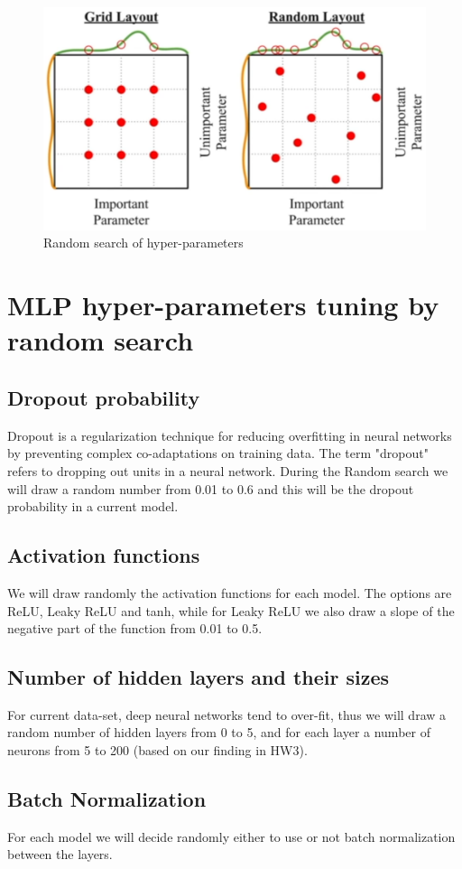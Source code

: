 \documentclass[12pt]{article}
\begin{document}
\begin{figure}[h]
\centering
\includegraphics[width=.6\linewidth]{pics/random_search}
\caption{Random search of hyper-parameters}
\end{figure}

\section{MLP hyper-parameters tuning by random search}
\subsection{Dropout probability}
Dropout is a regularization technique for reducing overfitting in neural networks by preventing complex co-adaptations on training data. The term "dropout" refers to dropping out units in a neural network. During the Random search we will draw a random number from 0.01 to 0.6 and this will be the dropout probability in a current model. 
\subsection{Activation functions}
We will draw randomly the activation functions for each model. The options are ReLU, Leaky ReLU and tanh, while for Leaky ReLU we also draw a slope of the negative part of the function from 0.01 to 0.5.
\subsection{Number of hidden layers and their sizes}
For current data-set, deep neural networks tend to over-fit, thus we will draw a random number of hidden layers from 0 to 5, and for each layer a number of neurons from 5 to 200 (based on our finding in HW3).
\subsection{Batch Normalization}
For each model we will decide randomly either to use or not batch normalization between the layers. 
\end{document}
